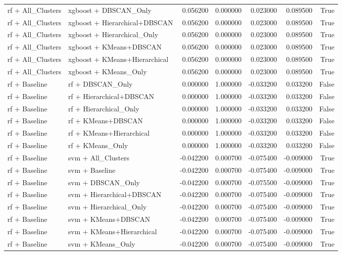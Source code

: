 \begin{tabular}{llrrrrr}
rf + All_Clusters & xgboost + DBSCAN_Only & 0.056200 & 0.000000 & 0.023000 & 0.089500 & True \\
rf + All_Clusters & xgboost + Hierarchical+DBSCAN & 0.056200 & 0.000000 & 0.023000 & 0.089500 & True \\
rf + All_Clusters & xgboost + Hierarchical_Only & 0.056200 & 0.000000 & 0.023000 & 0.089500 & True \\
rf + All_Clusters & xgboost + KMeans+DBSCAN & 0.056200 & 0.000000 & 0.023000 & 0.089500 & True \\
rf + All_Clusters & xgboost + KMeans+Hierarchical & 0.056200 & 0.000000 & 0.023000 & 0.089500 & True \\
rf + All_Clusters & xgboost + KMeans_Only & 0.056200 & 0.000000 & 0.023000 & 0.089500 & True \\
rf + Baseline & rf + DBSCAN_Only & 0.000000 & 1.000000 & -0.033200 & 0.033200 & False \\
rf + Baseline & rf + Hierarchical+DBSCAN & 0.000000 & 1.000000 & -0.033200 & 0.033200 & False \\
rf + Baseline & rf + Hierarchical_Only & 0.000000 & 1.000000 & -0.033200 & 0.033200 & False \\
rf + Baseline & rf + KMeans+DBSCAN & 0.000000 & 1.000000 & -0.033200 & 0.033200 & False \\
rf + Baseline & rf + KMeans+Hierarchical & 0.000000 & 1.000000 & -0.033200 & 0.033200 & False \\
rf + Baseline & rf + KMeans_Only & 0.000000 & 1.000000 & -0.033200 & 0.033200 & False \\
rf + Baseline & svm + All_Clusters & -0.042200 & 0.000700 & -0.075400 & -0.009000 & True \\
rf + Baseline & svm + Baseline & -0.042200 & 0.000700 & -0.075400 & -0.009000 & True \\
rf + Baseline & svm + DBSCAN_Only & -0.042200 & 0.000700 & -0.075500 & -0.009000 & True \\
rf + Baseline & svm + Hierarchical+DBSCAN & -0.042200 & 0.000700 & -0.075400 & -0.009000 & True \\
rf + Baseline & svm + Hierarchical_Only & -0.042200 & 0.000700 & -0.075400 & -0.009000 & True \\
rf + Baseline & svm + KMeans+DBSCAN & -0.042200 & 0.000700 & -0.075400 & -0.009000 & True \\
rf + Baseline & svm + KMeans+Hierarchical & -0.042200 & 0.000700 & -0.075400 & -0.009000 & True \\
rf + Baseline & svm + KMeans_Only & -0.042200 & 0.000700 & -0.075400 & -0.009000 & True \\

\end{tabular}
